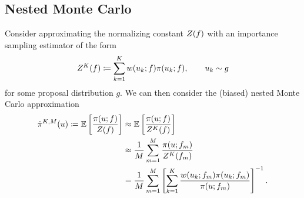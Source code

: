 \documentclass[12pt]{article}
\begin{document}
\subsection{Nested Monte Carlo}
Consider approximating the normalizing constant $Z(f)$ with an importance sampling
estimator of the form
\begin{equation}
Z^K(f) \coloneqq \sum_{k=1}^{K} w(u_k; f) \pi(u_k; f), 
\qquad u_k \sim g
\end{equation}
for some proposal distribution $g$. We can then consider the 
(biased) nested Monte Carlo approximation 
\begin{align}
\hat{\pi}^{K,M}(u) \coloneqq \mathbb{E}\left[\frac{\pi(u; f)}{Z(f)} \right]
&\approx \mathbb{E}\left[\frac{\pi(u; f)}{Z^K(f)} \right] \\
&\approx \frac{1}{M} \sum_{m=1}^{M} \frac{\pi(u; f_m)}{Z^K(f_m)} \\
&= \frac{1}{M} \sum_{m=1}^{M}  
\left[\sum_{k=1}^{K} \frac{w(u_k; f_m) \pi(u_k; f_m)}{\pi(u; f_m)}\right]^{-1}.
\end{align}
\end{document}
